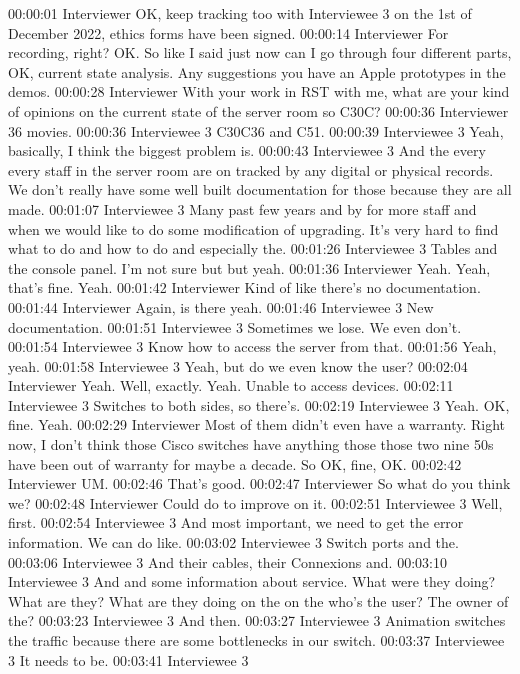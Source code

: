 00:00:01 Interviewer
OK, keep tracking too with Interviewee 3 on the 1st of December 2022, ethics forms have been signed.
00:00:14 Interviewer
For recording, right? OK. So like I said just now can I go through four different parts, OK, current state analysis. Any suggestions you have an Apple prototypes in the demos.
00:00:28 Interviewer
With your work in RST with me, what are your kind of opinions on the current state of the server room so C30C?
00:00:36 Interviewer
36 movies.
00:00:36 Interviewee 3
C30C36 and C51.
00:00:39 Interviewee 3
Yeah, basically, I think the biggest problem is.
00:00:43 Interviewee 3
And the every every staff in the server room are on tracked by any digital or physical records. We don't really have some well built documentation for those because they are all made.
00:01:07 Interviewee 3
Many past few years and by for more staff and when we would like to do some modification of upgrading. It's very hard to find what to do and how to do and especially the.
00:01:26 Interviewee 3
Tables and the console panel. I'm not sure but but yeah.
00:01:36 Interviewer
Yeah. Yeah, that's fine. Yeah.
00:01:42 Interviewer
Kind of like there's no documentation.
00:01:44 Interviewer
Again, is there yeah.
00:01:46 Interviewee 3
New documentation.
00:01:51 Interviewee 3
Sometimes we lose. We even don't.
00:01:54 Interviewee 3
Know how to access the server from that.
00:01:56
Yeah, yeah.
00:01:58 Interviewee 3
Yeah, but do we even know the user?
00:02:04 Interviewer
Yeah. Well, exactly. Yeah. Unable to access devices.
00:02:11 Interviewee 3
Switches to both sides, so there's.
00:02:19 Interviewee 3
Yeah. OK, fine. Yeah.
00:02:29 Interviewer
Most of them didn't even have a warranty. Right now, I don't think those Cisco switches have anything those those two nine 50s have been out of warranty for maybe a decade. So OK, fine, OK.
00:02:42 Interviewer
UM.
00:02:46
That's good.
00:02:47 Interviewer
So what do you think we?
00:02:48 Interviewer
Could do to improve on it.
00:02:51 Interviewee 3
Well, first.
00:02:54 Interviewee 3
And most important, we need to get the error information. We can do like.
00:03:02 Interviewee 3
Switch ports and the.
00:03:06 Interviewee 3
And their cables, their Connexions and.
00:03:10 Interviewee 3
And and some information about service. What were they doing? What are they? What are they doing on the on the who's the user? The owner of the?
00:03:23 Interviewee 3
And then.
00:03:27 Interviewee 3
Animation switches the traffic because there are some bottlenecks in our switch.
00:03:37 Interviewee 3
It needs to be.
00:03:41 Interviewee 3
